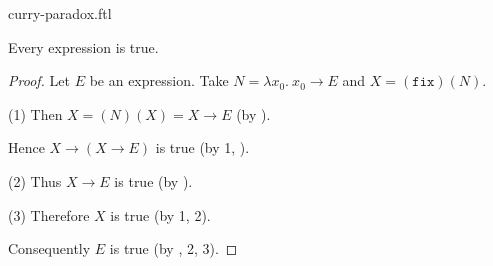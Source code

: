 \documentclass{article}
\newcommand{\varzero}{x_0}
\newcommand{\abs}[2]{\lambda#1.\ #2}
\newcommand{\app}[2]{(#1)(#2)}
\newcommand{\fix}{\texttt{fix}}
\begin{document}
\begin{smodule}{curry-paradox.ftl}
\begin{forthel}
  \begin{theorem*}[title=Curry's Paradox,id=curry_paradox]
    Every expression is true.
  \end{theorem*}
  \begin{proof}
    Let $E$ be an expression.
    Take $N = \abs{\varzero}{\varzero \rightarrow E}$ and $X = \app{\fix}{N}.$

    (1) Then $X = \app{N}{X} = X \rightarrow E$ (by ).

    Hence $X \rightarrow (X \rightarrow E)$ is true (by 1, ).

    (2) Thus $X \rightarrow E$ is true (by ).

    (3) Therefore $X$ is true (by 1, 2).

    Consequently $E$ is true (by , 2, 3).
  \end{proof}
\end{forthel}

\printbibliography
{}
\end{smodule}
\end{document}
